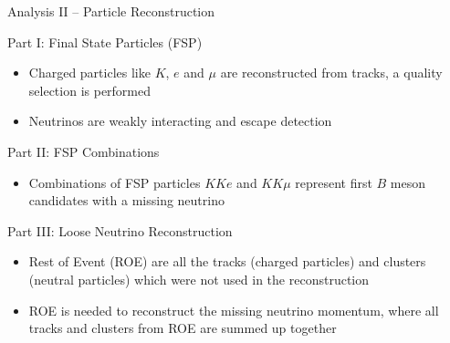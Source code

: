 \documentclass[serif]{beamer}
\begin{document}
\begin{frame}[t]{Analysis II -- Particle Reconstruction}

\vspace{-3mm}
\small

\begin{block}{Part I: Final State Particles (FSP)}
\begin{itemize}
	\item Charged particles like $K$, $e$ and $\mu$ are reconstructed from tracks, a quality selection is performed
	\item Neutrinos are weakly interacting and escape detection
\end{itemize}
\end{block}

\begin{block}{Part II: FSP Combinations}
	\begin{itemize}
		\item Combinations of FSP particles $KKe$ and $KK\mu$ represent first $B$ meson candidates with a missing neutrino
	\end{itemize}
\end{block}

\begin{block}{Part III: Loose Neutrino Reconstruction}
	\begin{itemize}
		\item Rest of Event (ROE) are all the tracks (charged particles) and clusters (neutral particles) which were not used in the reconstruction
		\item ROE is needed to reconstruct the missing neutrino momentum, where all tracks and clusters from ROE are summed up together
	\end{itemize}
\end{block}


\end{frame}

\end{document}
